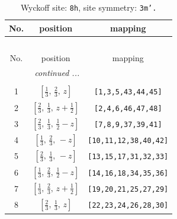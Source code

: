 \documentclass[fleqn,8pt]{jsarticle}
\begin{document}
\begin{longtable}{ccc}
\caption{Wyckoff site: {\tt 8h}, site symmetry: {\tt 3m'.}}
 \\
 \hline \hline
No. & position & mapping \\ \hline \endfirsthead

\multicolumn{2}{l}{\tablename\ \thetable{}} \\
 \hline \hline
No. & position & mapping \\ \hline \endhead

 \hline \hline
\multicolumn{2}{r}{\footnotesize\it continued ...} \\ \endfoot

 \hline \hline
\multicolumn{2}{r}{} \\ \endlastfoot

1 & $\left[ \frac{1}{3},\, \frac{2}{3},\, z \right]$ & {\tt [1,3,5,43,44,45]} \\ \hline
2 & $\left[ \frac{2}{3},\, \frac{1}{3},\, z + \frac{1}{2} \right]$ & {\tt [2,4,6,46,47,48]} \\ \hline
3 & $\left[ \frac{2}{3},\, \frac{1}{3},\, \frac{1}{2} - z \right]$ & {\tt [7,8,9,37,39,41]} \\ \hline
4 & $\left[ \frac{1}{3},\, \frac{2}{3},\, - z \right]$ & {\tt [10,11,12,38,40,42]} \\ \hline
5 & $\left[ \frac{2}{3},\, \frac{1}{3},\, - z \right]$ & {\tt [13,15,17,31,32,33]} \\ \hline
6 & $\left[ \frac{1}{3},\, \frac{2}{3},\, \frac{1}{2} - z \right]$ & {\tt [14,16,18,34,35,36]} \\ \hline
7 & $\left[ \frac{1}{3},\, \frac{2}{3},\, z + \frac{1}{2} \right]$ & {\tt [19,20,21,25,27,29]} \\ \hline
8 & $\left[ \frac{2}{3},\, \frac{1}{3},\, z \right]$ & {\tt [22,23,24,26,28,30]} \\
\end{longtable}
\renewcommand{\arraystretch}{1.2}
\end{document}
